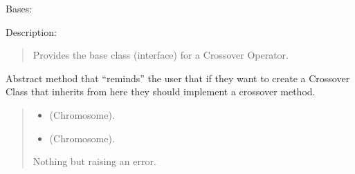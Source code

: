\documentclass[letterpaper,10pt,english]{sphinxmanual}
\begin{document}
\begin{fulllineitems}
\label{\detokenize{pygenalgo.operators.crossover:pygenalgo.operators.crossover.crossover_operator.CrossoverOperator}}
\pysigstartsignatures
{}
\pysigstopsignatures
\sphinxAtStartPar
Bases: {\hyperref[\detokenize{pygenalgo.operators:pygenalgo.operators.genetic_operator.GeneticOperator}]{}}

\sphinxAtStartPar
Description:
\begin{quote}

\sphinxAtStartPar
Provides the base class (interface) for a Crossover Operator.
\end{quote}

\begin{fulllineitems}
\label{\detokenize{pygenalgo.operators.crossover:pygenalgo.operators.crossover.crossover_operator.CrossoverOperator.crossover}}
\pysigstartsignatures
{}
\pysigstopsignatures
\sphinxAtStartPar
Abstract method that “reminds” the user that if they want to
create a Crossover Class that inherits from here they should
implement a crossover method.
\begin{quote}\begin{description}
\begin{itemize}
\item {} 
\sphinxAtStartPar
{} \textendash{} (Chromosome).

\item {} 
\sphinxAtStartPar
{} \textendash{} (Chromosome).

\end{itemize}

\sphinxAtStartPar
Nothing but raising an error.

\end{description}\end{quote}

\end{fulllineitems}


\end{fulllineitems}
\end{document}
